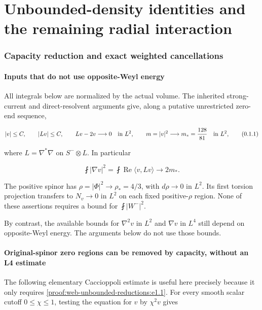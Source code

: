 
\clearpage\part{Unbounded-density identities and the remaining radial interaction}


\section{Capacity reduction and exact weighted cancellations}
\label{sec:web-unbounded-reductions}
\hypertarget{proof:web-unbounded-reductions:s1}{%
\subsection{Inputs that do not use opposite-Weyl energy}\label{proof:web-unbounded-reductions:s1}}

All integrals below are normalized by the actual volume. The inherited strong-current and direct-resolvent arguments give, along a putative unrestricted zero-end sequence,

\[
 |v|\le C,
 \qquad |Lv|\le C,
 \qquad Lv-2v\longrightarrow0\quad\hbox{in }L^2,
 \qquad m=|v|^2\longrightarrow m_*={128\over81}\quad\hbox{in }L^2,
 \tag{\thesection.1.1}\label{proof:web-unbounded-reductions:e1.1}
\]

where \(L=\nabla^*\nabla\) on \(S^-\otimes L\). In particular

\[
 \fint|\nabla v|^2=\fint\operatorname{Re}\langle v,Lv\rangle
 \longrightarrow2m_*.
 \tag{\thesection.1.2}\label{proof:web-unbounded-reductions:e1.2}
\]

The positive spinor has \(\rho=|\Phi|^2\to\rho_*=4/3\), with \(d\rho\to0\) in \(L^2\). Its first torsion projection transfers to \(N_v\to0\) in \(L^2\) on each fixed positive-\(\rho\) region. None of these assertions requires a bound for \(\fint|W^-|^2\).

By contrast, the available bounds for \(\nabla^2v\) in \(L^2\) and \(\nabla v\) in \(L^4\) still depend on opposite-Weyl energy. The arguments below do not use those bounds.

\hypertarget{proof:web-unbounded-reductions:s2}{%
\subsection{Original-spinor zero regions can be removed by capacity, without an L4 estimate}\label{proof:web-unbounded-reductions:s2}}

The following elementary Caccioppoli estimate is useful here precisely because it only requires \eqref{proof:web-unbounded-reductions:e1.1}. For every smooth scalar cutoff \(0\le\chi\le1\), testing the equation for \(v\) by \(\chi^2v\) gives

